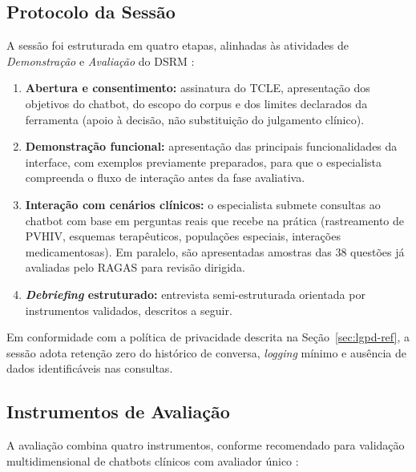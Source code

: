 \documentclass[
  12pt,
  oneside,
  a4paper,
  english,
  brazil
]{abntex2}
\begin{document}
\subsection{Protocolo da Sessão}

A sessão foi estruturada em quatro etapas, alinhadas às atividades de
\textit{Demonstração} e \textit{Avaliação} do DSRM \cite{peffers2007}:

\begin{enumerate}[label=\textbf{(\arabic*)}]
  \item \textbf{Abertura e consentimento:} assinatura do TCLE, apresentação dos
        objetivos do chatbot, do escopo do corpus e dos limites declarados da
        ferramenta (apoio à decisão, não substituição do julgamento clínico).
  \item \textbf{Demonstração funcional:} apresentação das principais funcionalidades
        da interface, com exemplos previamente preparados, para que o especialista
        compreenda o fluxo de interação antes da fase avaliativa.
  \item \textbf{Interação com cenários clínicos:} o especialista submete consultas
        ao chatbot com base em perguntas reais que recebe na prática
        (rastreamento de PVHIV, esquemas terapêuticos, populações especiais,
        interações medicamentosas). Em paralelo, são apresentadas amostras das 38
        questões já avaliadas pelo RAGAS para revisão dirigida.
  \item \textbf{\textit{Debriefing} estruturado:} entrevista semi-estruturada
        orientada por instrumentos validados, descritos a seguir.
\end{enumerate}

Em conformidade com a política de privacidade descrita na
Seção~\ref{sec:lgpd-ref}, a sessão adota retenção zero do histórico de conversa,
\textit{logging} mínimo e ausência de dados identificáveis nas consultas.

\subsection{Instrumentos de Avaliação}

A avaliação combina quatro instrumentos, conforme recomendado para validação
multidimensional de chatbots clínicos com avaliador único \cite{ocaf2024}:
\end{document}
